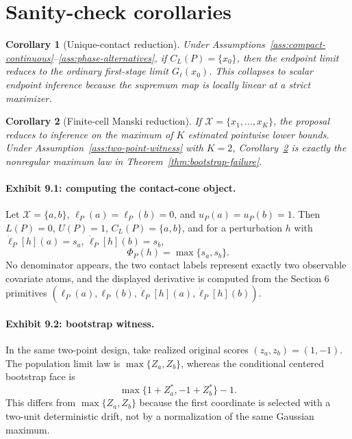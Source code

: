 \documentclass[11pt]{article}
\theoremstyle{definition}
\theoremstyle{plain}
\newtheorem{corollary}{Corollary}
\theoremstyle{remark}
\begin{document}
\section{Sanity-check corollaries}
\begin{corollary}[Unique-contact reduction]\label{cor:unique-contact}
Under Assumptions~\ref{ass:compact-continuous}--\ref{ass:phase-alternatives}, if \(C_L(P)=\{x_0\}\), then the endpoint limit reduces to the ordinary first-stage limit \(G_\ell(x_0)\).  This collapses to scalar endpoint inference because the supremum map is locally linear at a strict maximizer.
\end{corollary}

\begin{corollary}[Finite-cell Manski reduction]\label{cor:finite-cell}
If \(\mathcal X=\{x_1,\ldots,x_K\}\), the proposal reduces to inference on the maximum of \(K\) estimated pointwise lower bounds.  Under Assumption~\ref{ass:two-point-witness} with \(K=2\), Corollary~\ref{cor:finite-cell} is exactly the nonregular maximum law in Theorem~\ref{thm:bootstrap-failure}.
\end{corollary}

\paragraph{Exhibit 9.1: computing the contact-cone object.}
Let \(\mathcal X=\{a,b\}\), \(\ell_P(a)=\ell_P(b)=0\), and \(u_P(a)=u_P(b)=1\).  Then \(L(P)=0\), \(U(P)=1\), \(C_L(P)=\{a,b\}\), and for a perturbation \(h\) with \(\dot\ell_P[h](a)=s_a\), \(\dot\ell_P[h](b)=s_b\),
\[
  \Phi_P(h)=\max\{s_a,s_b\}.
\]
No denominator appears, the two contact labels represent exactly two observable covariate atoms, and the displayed derivative is computed from the Section 6 primitives \((\ell_P(a),\ell_P(b),\dot\ell_P[h](a),\dot\ell_P[h](b))\).

\paragraph{Exhibit 9.2: bootstrap witness.}
In the same two-point design, take realized original scores \((z_a,z_b)=(1,-1)\).  The population limit law is \(\max\{Z_a,Z_b\}\), whereas the conditional centered bootstrap face is
\[
  \max\{1+Z_a^*,-1+Z_b^*\}-1.
\]
This differs from \(\max\{Z_a,Z_b\}\) because the first coordinate is selected with a two-unit deterministic drift, not by a normalization of the same Gaussian maximum.
\end{document}
